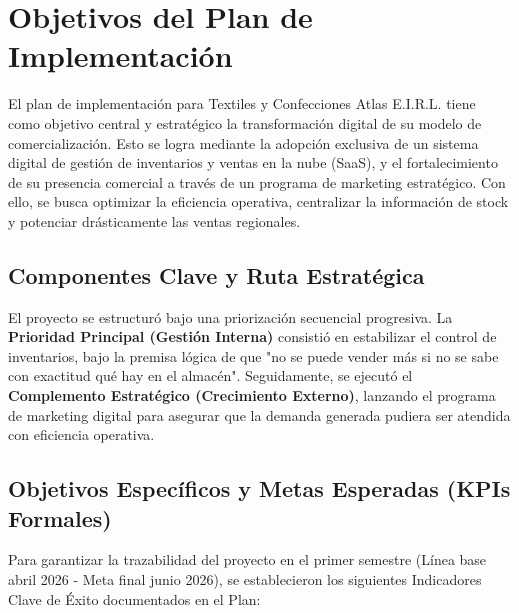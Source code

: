 \section{Objetivos del Plan de Implementación}

El plan de implementación para Textiles y Confecciones Atlas E.I.R.L. tiene como objetivo central y estratégico la transformación digital de su modelo de comercialización. Esto se logra mediante la adopción exclusiva de un sistema digital de gestión de inventarios y ventas en la nube (SaaS), y el fortalecimiento de su presencia comercial a través de un programa de marketing estratégico. Con ello, se busca optimizar la eficiencia operativa, centralizar la información de stock y potenciar drásticamente las ventas regionales.

\subsection{Componentes Clave y Ruta Estratégica}
El proyecto se estructuró bajo una priorización secuencial progresiva. La \textbf{Prioridad Principal (Gestión Interna)} consistió en estabilizar el control de inventarios, bajo la premisa lógica de que "no se puede vender más si no se sabe con exactitud qué hay en el almacén". Seguidamente, se ejecutó el \textbf{Complemento Estratégico (Crecimiento Externo)}, lanzando el programa de marketing digital para asegurar que la demanda generada pudiera ser atendida con eficiencia operativa.

\subsection{Objetivos Específicos y Metas Esperadas (KPIs Formales)}
Para garantizar la trazabilidad del proyecto en el primer semestre (Línea base abril 2026 - Meta final junio 2026), se establecieron los siguientes Indicadores Clave de Éxito documentados en el Plan:

